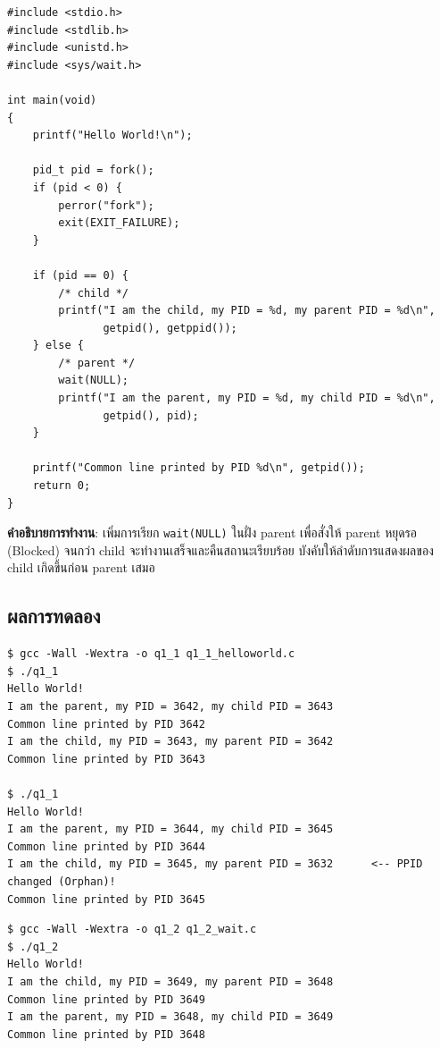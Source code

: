 \documentclass[a4paper,12pt]{article}
\newcommand{\code}[1]{\texttt{#1}}
\begin{document}
\begin{lstlisting}[caption={q1\_2\_wait.c -- fork() with wait()},label={lst:q1_2}]
#include <stdio.h>
#include <stdlib.h>
#include <unistd.h>
#include <sys/wait.h>

int main(void)
{
    printf("Hello World!\n");

    pid_t pid = fork();
    if (pid < 0) {
        perror("fork");
        exit(EXIT_FAILURE);
    }

    if (pid == 0) {
        /* child */
        printf("I am the child, my PID = %d, my parent PID = %d\n",
               getpid(), getppid());
    } else {
        /* parent */
        wait(NULL);
        printf("I am the parent, my PID = %d, my child PID = %d\n",
               getpid(), pid);
    }

    printf("Common line printed by PID %d\n", getpid());
    return 0;
}
\end{lstlisting}

\textbf{คำอธิบายการทำงาน}: เพิ่มการเรียก \code{wait(NULL)} ในฝั่ง parent เพื่อสั่งให้ parent หยุดรอ (Blocked) จนกว่า child จะทำงานเสร็จและคืนสถานะเรียบร้อย บังคับให้ลำดับการแสดงผลของ child เกิดขึ้นก่อน parent เสมอ

\newpage

\subsection{ผลการทดลอง}

\begin{lstlisting}[style=terminal,caption={ผลลัพธ์ของข้อ 1.1 (ไม่มี wait())}]
$ gcc -Wall -Wextra -o q1_1 q1_1_helloworld.c
$ ./q1_1
Hello World!
I am the parent, my PID = 3642, my child PID = 3643
Common line printed by PID 3642
I am the child, my PID = 3643, my parent PID = 3642
Common line printed by PID 3643

$ ./q1_1
Hello World!
I am the parent, my PID = 3644, my child PID = 3645
Common line printed by PID 3644
I am the child, my PID = 3645, my parent PID = 3632      <-- PPID changed (Orphan)!
Common line printed by PID 3645
\end{lstlisting}

\begin{lstlisting}[style=terminal,caption={ผลลัพธ์ของข้อ 1.2 (มี wait())}]
$ gcc -Wall -Wextra -o q1_2 q1_2_wait.c
$ ./q1_2
Hello World!
I am the child, my PID = 3649, my parent PID = 3648
Common line printed by PID 3649
I am the parent, my PID = 3648, my child PID = 3649
Common line printed by PID 3648
\end{lstlisting}
\end{document}
